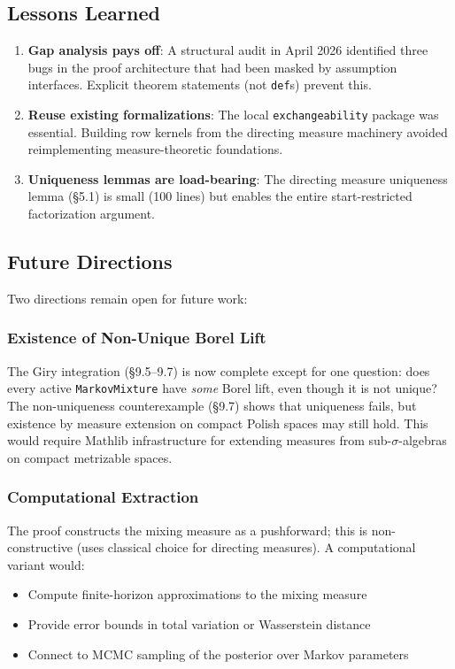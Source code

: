 \documentclass[11pt,a4paper]{article}
\theoremstyle{definition}
\begin{document}
\subsection{Lessons Learned}

\begin{enumerate}
\item \textbf{Gap analysis pays off}: A structural audit in April 2026
  identified three bugs in the proof architecture that had been masked by
  assumption interfaces. Explicit theorem statements (not \texttt{def}s)
  prevent this.
\item \textbf{Reuse existing formalizations}: The local \texttt{exchangeability}
  package was essential. Building row kernels from the directing measure
  machinery avoided reimplementing measure-theoretic foundations.
\item \textbf{Uniqueness lemmas are load-bearing}: The directing measure
  uniqueness lemma (\S5.1) is small (100 lines) but enables the entire
  start-restricted factorization argument.
\end{enumerate}

\subsection{Future Directions}

Two directions remain open for future work:

\subsubsection{Existence of Non-Unique Borel Lift}

The Giry integration (\S9.5--9.7) is now complete except for one question:
does every active \texttt{MarkovMixture} have \emph{some} Borel lift, even
though it is not unique? The non-uniqueness counterexample (\S9.7) shows that
uniqueness fails, but existence by measure extension on compact Polish spaces
may still hold. This would require Mathlib infrastructure for extending measures
from sub-$\sigma$-algebras on compact metrizable spaces.

\subsubsection{Computational Extraction}

The proof constructs the mixing measure as a pushforward; this is
non-constructive (uses classical choice for directing measures).
A computational variant would:
\begin{itemize}
\item Compute finite-horizon approximations to the mixing measure
\item Provide error bounds in total variation or Wasserstein distance
\item Connect to MCMC sampling of the posterior over Markov parameters
\end{itemize}
\end{document}
